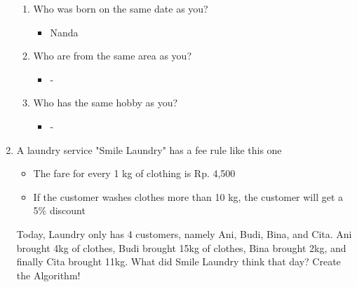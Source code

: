 \documentclass[12pt,titlepage]{article}
\begin{document}
\begin{enumerate}
{{\begin{enumerate}
{\begin{itemize}
                        \item Virza
                    \end{itemize}
                }
                \item {
                    Who was born on the same date as you?
                    \begin{itemize}
                        \item Nanda
                    \end{itemize}
                }
                \item {
                    Who are from the same area as you?
                    \begin{itemize}
                        \item -
                    \end{itemize}
                }
                \item {
                    Who has the same hobby as you?
                    \begin{itemize}
                        \item -
                    \end{itemize}
                }
            \end{enumerate}
        }
    }
    \item {
        A laundry service "Smile Laundry" has a fee rule like this one
        \begin{itemize}
            \item The fare for every 1 kg of clothing is Rp. 4,500
            \item If the customer washes clothes more than 10 kg, the customer will get a 5\% discount
        \end{itemize}
        Today, Laundry only has 4 customers, namely Ani, Budi, Bina, and Cita.
        Ani brought 4kg of clothes, Budi brought 15kg of clothes, Bina brought 2kg, and finally Cita brought 11kg.
        What did Smile Laundry think that day? Create the Algorithm!

}
\end{enumerate}
\end{document}
